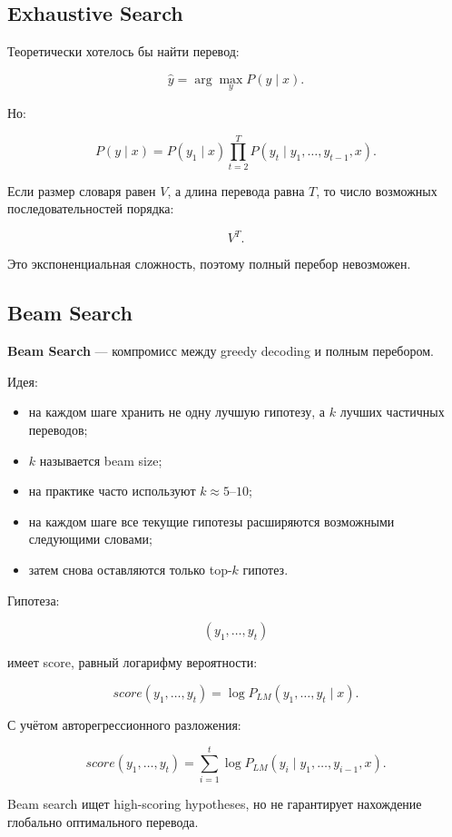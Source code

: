 \documentclass[a4paper,12pt]{article}
\begin{document}
\subsection{Exhaustive Search}

Теоретически хотелось бы найти перевод:

\[
\hat{y}
=
\arg\max_y P(y \mid x).
\]

Но:

\[
P(y \mid x)
=
P(y_1 \mid x)
\prod_{t=2}^{T}
P(y_t \mid y_1, \dots, y_{t-1}, x).
\]

Если размер словаря равен \(V\), а длина перевода равна \(T\), то число возможных последовательностей порядка:

\[
V^T.
\]

Это экспоненциальная сложность, поэтому полный перебор невозможен.

\subsection{Beam Search}

\textbf{Beam Search} --- компромисс между greedy decoding и полным перебором.

Идея:

\begin{itemize}
    \item на каждом шаге хранить не одну лучшую гипотезу, а \(k\) лучших частичных переводов;
    \item \(k\) называется beam size;
    \item на практике часто используют \(k \approx 5\)--\(10\);
    \item на каждом шаге все текущие гипотезы расширяются возможными следующими словами;
    \item затем снова оставляются только top-\(k\) гипотез.
\end{itemize}

Гипотеза:

\[
(y_1, \dots, y_t)
\]

имеет score, равный логарифму вероятности:

\[
score(y_1,\dots,y_t)
=
\log P_{LM}(y_1,\dots,y_t \mid x).
\]

С учётом авторегрессионного разложения:

\[
score(y_1,\dots,y_t)
=
\sum_{i=1}^{t}
\log P_{LM}(y_i \mid y_1,\dots,y_{i-1}, x).
\]

Beam search ищет high-scoring hypotheses, но не гарантирует нахождение глобально оптимального перевода.
\end{document}
